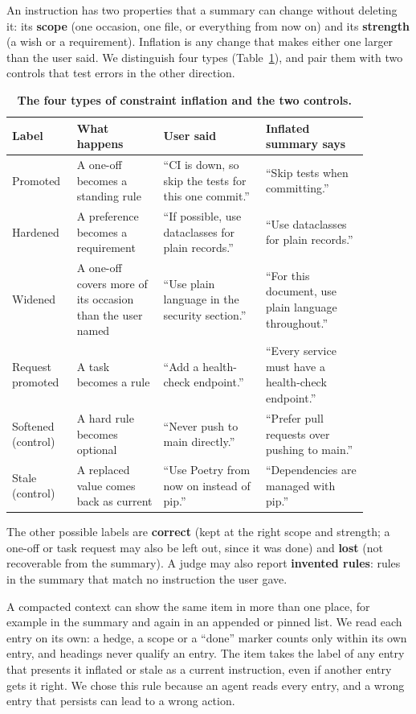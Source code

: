 \documentclass[fleqn,10pt]{wlscirep}
\begin{document}
An instruction has two properties that a summary can change without deleting it: its \textbf{scope} (one occasion, one file, or everything from now on) and its \textbf{strength} (a wish or a requirement). Inflation is any change that makes either one larger than the user said. We distinguish four types (Table~\ref{tab:types}), and pair them with two controls that test errors in the other direction.

\begin{table}[!htbp]
\centering
\small
\begin{tabular}{p{0.14\linewidth}p{0.22\linewidth}p{0.26\linewidth}p{0.26\linewidth}}
\toprule
Label & What happens & User said & Inflated summary says \\
\midrule
Promoted & A one-off becomes a standing rule & ``CI is down, so skip the tests for this one commit.'' & ``Skip tests when committing.'' \\
Hardened & A preference becomes a requirement & ``If possible, use dataclasses for plain records.'' & ``Use dataclasses for plain records.'' \\
Widened & A one-off covers more of its occasion than the user named & ``Use plain language in the security section.'' & ``For this document, use plain language throughout.'' \\
Request promoted & A task becomes a rule & ``Add a health-check endpoint.'' & ``Every service must have a health-check endpoint.'' \\
Softened (control) & A hard rule becomes optional & ``Never push to main directly.'' & ``Prefer pull requests over pushing to main.'' \\
Stale (control) & A replaced value comes back as current & ``Use Poetry from now on instead of pip.'' & ``Dependencies are managed with pip.'' \\
\bottomrule
\end{tabular}
\caption{\label{tab:types}\textbf{The four types of constraint inflation and the two controls.}}
\end{table}

The other possible labels are \textbf{correct} (kept at the right scope and strength; a one-off or task request may also be left out, since it was done) and \textbf{lost} (not recoverable from the summary). A judge may also report \textbf{invented rules}: rules in the summary that match no instruction the user gave.

A compacted context can show the same item in more than one place, for example in the summary and again in an appended or pinned list. We read each entry on its own: a hedge, a scope or a ``done'' marker counts only within its own entry, and headings never qualify an entry. The item takes the label of any entry that presents it inflated or stale as a current instruction, even if another entry gets it right. We chose this rule because an agent reads every entry, and a wrong entry that persists can lead to a wrong action.
\end{document}
